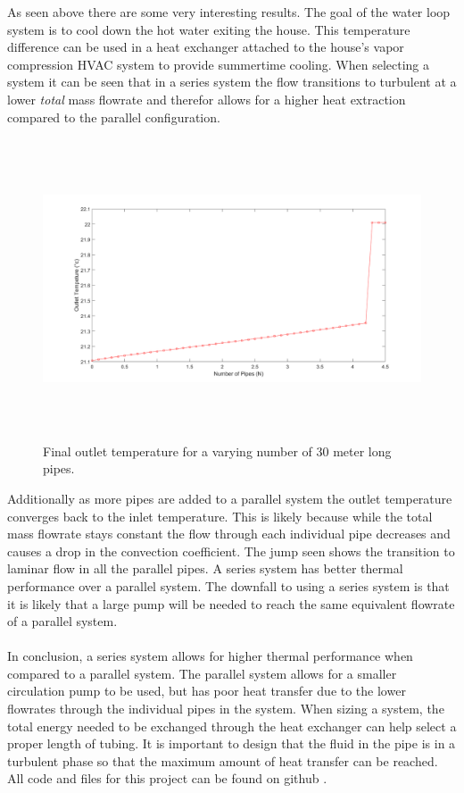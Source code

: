 %
\noindent
As seen above there are some very interesting results. The goal of the water loop system is to cool down the hot water exiting the house. This temperature difference can be used in a heat exchanger attached to the house's vapor compression HVAC system to provide summertime cooling. When selecting a system it can be seen that in a series system the flow transitions to turbulent at a lower \textit{total} mass flowrate and therefor allows for a higher heat extraction compared to the parallel configuration.
%
\begin{figure}[H]
    \centering
    \includegraphics[height=3.5in]{pictures/outlet_parallel_num_pipes.png}
    \caption{Final outlet temperature for a varying number of 30 meter long pipes.}
\end{figure}
%
\noindent
Additionally as more pipes are added to a parallel system the outlet temperature converges back to the inlet temperature. This is likely because while the total mass flowrate stays constant the flow through each individual pipe decreases and causes a drop in the convection coefficient. The jump seen shows the transition to laminar flow in all the parallel pipes. A series system has better thermal performance over a parallel system. The downfall to using a series system is that it is likely that a large pump will be needed to reach the same equivalent flowrate of a parallel system. \\ \\
%
In conclusion, a series system allows for higher thermal performance when compared to a parallel system. The parallel system allows for a smaller circulation pump to be used, but has poor heat transfer due to the lower flowrates through the individual pipes in the system. When sizing a system, the total energy needed to be exchanged through the heat exchanger can help select a proper length of tubing. It is important to design that the fluid in the pipe is in a turbulent phase so that the maximum amount of heat transfer can be reached. All code and files for this project can be found on github \cite{github}.


